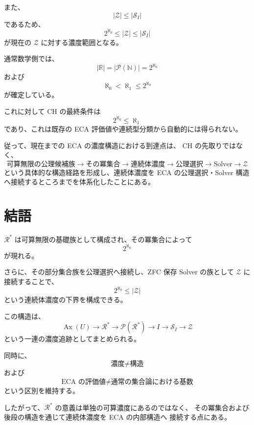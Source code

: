 \documentclass[11pt,a4paper]{article}
\newcommand{\Pow}{\mathcal P}
\newcommand{\Solver}{\mathcal S}
\newcommand{\Zset}{\mathcal Z}
\newcommand{\Rstar}{\mathcal R^*}
\newcommand{\N}{\mathbb N}
\newcommand{\R}{\mathbb R}
\begin{document}
また、
\[
\boxed{|\Zset|\leq|\Solver_I|}
\]
であるため、
\[
\boxed{
2^{\aleph_0}
\leq
|\Zset|
\leq
|\Solver_I|
}
\]
が現在の $\Zset$ に対する濃度範囲となる。

通常数学側では、
\[
\boxed{
|\R|=|\Pow(\N)|=2^{\aleph_0}
}
\]
および
\[
\boxed{
\aleph_0<\aleph_1\leq2^{\aleph_0}
}
\]
が確定している。

これに対して CH の最終条件は
\[
2^{\aleph_0}\leq\aleph_1
\]
であり、これは既存の ECA 評価値や連続型分類から自動的には得られない。

従って、現在までの ECA の濃度構造における到達点は、
CH の先取りではなく、
\[
\boxed{
\text{可算無限の公理候補族}
\longrightarrow
\text{その冪集合}
\longrightarrow
\text{連続体濃度}
\longrightarrow
\text{公理選択}
\longrightarrow
\text{Solver}
\longrightarrow
\mathcal Z
}
\]
という具体的な構造経路を形成し、連続体濃度を ECA の公理選択・Solver
構造へ接続するところまでを体系化したことにある。

\section{結語}

$\Rstar$ は可算無限の基礎族として構成され、その冪集合によって
\[
2^{\aleph_0}
\]
が現れる。

さらに、その部分集合族を公理選択へ接続し、ZFC 保存 Solver の族として
$\Zset$ に接続することで、
\[
2^{\aleph_0}\leq|\Zset|
\]
という連続体濃度の下界を構成できる。

この構造は、
\[
\operatorname{Ax}(U)
\to
\Rstar
\to
\Pow(\Rstar)
\to
I
\to
\Solver_I
\to
\Zset
\]
という一連の濃度追跡としてまとめられる。

同時に、
\[
\text{濃度}\neq\text{構造}
\]
および
\[
\text{ECA の評価値}\neq\text{通常の集合論における基数}
\]
という区別を維持する。

したがって、$\Rstar$ の意義は単独の可算濃度にあるのではなく、
その冪集合および後段の構造を通じて連続体濃度を ECA の内部構造へ
接続する点にある。
\end{document}
